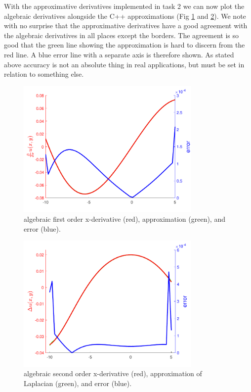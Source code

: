 \documentclass[paper=a4, fontsize=12pt]{article} %
\begin{document}
With the approximative derivatives implemented in task 2 we can now plot the algebraic derivatives alongside the C++ approximations (Fig \ref{fig:1derivX} and \ref{fig:2derivX}).
We note with no surprise that the approximative derivatives have a good agreement with the algebraic derivatives in all places except the borders. The agreement is so good that the green line showing the approximation is hard to discern from the red line. A blue error line with a separate axis is therefore shown. As stated above accuracy is not an absolute thing in real applications, but must be set in relation to something else.  


\begin{figure}[H]
  \centering
  \includegraphics[width=0.8\textwidth]{comparison-x.pdf}
  \caption{\small algebraic first order x-derivative (red), approximation (green), and error (blue).\label{fig:1derivX}}
\end{figure}



\begin{figure}[H]
  \centering
  \includegraphics[width=0.8\textwidth]{comparison-xx.pdf}
  \caption{\small algebraic second order x-derivative (red), approximation of Laplacian (green), and error (blue).\label{fig:2derivX}}
\end{figure}
\end{document}
